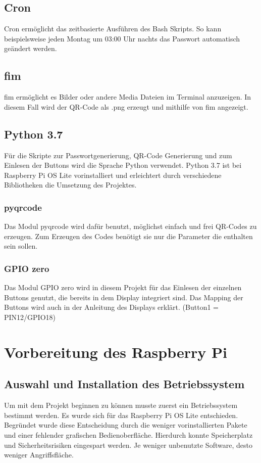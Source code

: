 \documentclass[a4paper,11pt,singlespacing]{article}
\begin{document}
    		\subsection{Cron}
				Cron ermöglicht das zeitbasierte Ausführen des Bash Skripts. So kann beispielsweise jeden Montag um 03:00 Uhr nachts das Passwort automatisch geändert werden. 
			\subsection{fim}
				fim ermöglicht es Bilder oder andere Media Dateien im Terminal anzuzeigen. In diesem Fall wird der QR-Code als .png erzeugt und mithilfe von fim angezeigt.
    		\subsection{Python 3.7}
    			Für die Skripte zur Passwortgenerierung, QR-Code Generierung und zum Einlesen der Buttons wird die Sprache Python verwendet. Python 3.7 ist bei Raspberry Pi OS Lite  vorinstalliert und erleichtert durch verschiedene Bibliotheken die Umsetzung des Projektes.
    			\subsubsection{pyqrcode}
    				Das Modul pyqrcode wird dafür benutzt, möglichst einfach und frei QR-Codes zu erzeugen. Zum Erzeugen des Codes benötigt sie nur die Parameter die enthalten sein sollen.
    			\subsubsection{GPIO zero}
    				Das Modul GPIO zero wird in diesem Projekt für das Einlesen der einzelnen Buttons genutzt, die bereits in dem Display integriert sind. Das Mapping der Buttons wird auch in der Anleitung des Displays erklärt. (Button1 = PIN12/GPIO18) \cite{Quote_gpio_zero}
    	
    	\section{Vorbereitung des Raspberry Pi}
    	\subsection{Auswahl und Installation des Betriebssystem}
    	    Um mit dem Projekt beginnen zu können musste zuerst ein Betriebssystem bestimmt werden.
        	Es wurde sich für das Raspberry Pi OS Lite entschieden. Begründet wurde diese Entscheidung  durch die weniger vorinstallierten Pakete und einer fehlender grafischen Bedienoberfläche. Hierdurch konnte Speicherplatz und Sicherheitsrisiken eingespart werden. Je weniger unbenutzte Software, desto weniger Angriffsfläche. \\ 
    	
\end{document}
